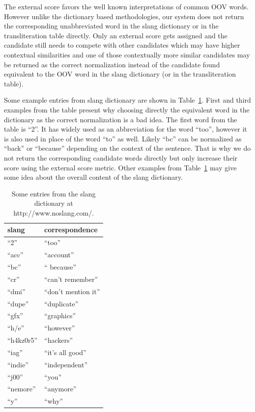 \documentclass[a4paper,onesided,12pt]{report}
\begin{document}
The external score favors the well known interpretations of common OOV words. However unlike the dictionary based methodologies, our system does not return the corresponding unabbreviated word in the slang dictionary or in the transliteration table directly. Only an external score gets assigned and the candidate still needs to compete with other candidates which may have higher contextual similarities and one of those contextually more similar candidates may be returned as the correct normalization instead of the candidate found equivalent to the OOV word in the slang dictionary (or in the transliteration table).

Some example entries from slang dictionary are shown in Table~\ref{tab:slang}. First and third examples from the table present why choosing directly the equivalent word in the dictionary as the correct normalization is a bad idea. The first word from the table is ``2''. It has widely used as an abbreviation for the word ``too'', however it is also used in place of the word ``to'' as well. Likely ``bc'' can be normalized as ``back'' or ``because'' depending on the context of the sentence. That is why we do not return the corresponding candidate words directly but only increase their score using the external score metric. Other examples from Table~\ref{tab:slang} may give some idea about the overall content of the slang dictionary.

\begin{table}[ht]
  \caption{Some entries from the slang dictionary at http://www.noslang.com/.}
  \centering
    \begin{tabular}[l]{|l|l|}
    \hline
    \textbf{slang} & \textbf{correspondence} \\\hline
    ``2'' & ``too'' \\\hline
    ``acc'' & ``account'' \\\hline
    ``bc'' & `` because'' \\\hline
    ``cr'' & ``can't remember'' \\\hline
    ``dmi'' & ``don't mention it'' \\\hline
    ``dupe'' & ``duplicate'' \\\hline
    ``gfx'' & ``graphics'' \\\hline
    ``h/e'' & ``however'' \\\hline
    ``h4kz0r5'' & ``hackers'' \\\hline
    ``iag'' & ``it's all good'' \\\hline
    ``indie''  & ``independent'' \\\hline
    ``j00'' & ``you'' \\\hline
    ``nemore'' & ``anymore''  \\\hline
    ``y'' & ``why'' \\\hline
  \end{tabular}
\label{tab:slang}
\end{table}
\end{document}
